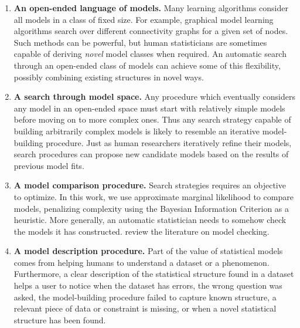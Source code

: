 \begin{enumerate}
\item {\bf An open-ended language of models.}
Many learning algorithms consider all models in a class of fixed size.
For example, graphical model learning algorithms \citep{Friedman03,Eaton07_uai} search over different connectivity graphs for a given set of nodes.
Such methods can be powerful, but human statisticians are sometimes capable of deriving \emph{novel} model classes when required.
An automatic search through an open-ended class of models can achieve some of this flexibility, %
possibly combining existing structures in novel ways.

\item {\bf A search through model space.}
Any procedure which eventually considers any model in an open-ended space must start with relatively simple models before moving on to more complex ones.
Thus any search strategy capable of building arbitrarily complex models is likely to resemble an iterative model-building procedure.
Just as human researchers iteratively refine their models, search procedures can propose new candidate models based on the results of previous model fits.

\item {\bf A model comparison procedure.}
Search strategies requires an objective to optimize.
In this work, we use approximate marginal likelihood to compare models, penalizing complexity using the Bayesian Information Criterion as a heuristic.
More generally, an automatic statistician needs to somehow check the models it has constructed.
\citet{gelman2012philosophy} review the literature on model checking.

\item {\bf A model description procedure.}
Part of the value of statistical models comes from helping humans to understand a dataset or a phenomenon.
Furthermore, a clear description of the statistical structure found in a dataset helps a user to notice when the dataset has errors, the wrong question was asked, the model-building procedure failed to capture known structure, a relevant piece of data or constraint is missing, or when a novel statistical structure has been found.
\end{enumerate}

